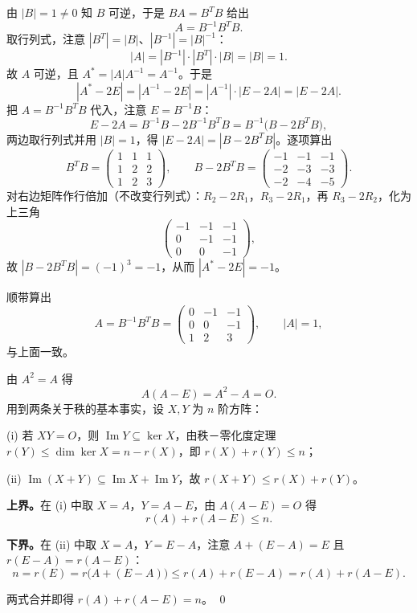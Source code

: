 \begin{solution}
由 $|B|=1\ne0$ 知 $B$ 可逆，于是 $BA=B^{T}B$ 给出
\[
A=B^{-1}B^{T}B .
\]
取行列式，注意 $|B^{T}|=|B|$、$|B^{-1}|=|B|^{-1}$：
\[
|A|=|B^{-1}|\cdot|B^{T}|\cdot|B|=|B|=1 .
\]
故 $A$ 可逆，且 $A^{*}=|A|A^{-1}=A^{-1}$。于是
\[
|A^{*}-2E|=|A^{-1}-2E|=|A^{-1}|\cdot|E-2A|=|E-2A| .
\]
把 $A=B^{-1}B^{T}B$ 代入，注意 $E=B^{-1}B$：
\[
E-2A=B^{-1}B-2B^{-1}B^{T}B=B^{-1}\bigl(B-2B^{T}B\bigr),
\]
两边取行列式并用 $|B|=1$，得 $|E-2A|=|B-2B^{T}B|$。逐项算出
\[
B^{T}B=\begin{pmatrix}1&1&1\\1&2&2\\1&2&3\end{pmatrix},\qquad
B-2B^{T}B=\begin{pmatrix}-1&-1&-1\\-2&-3&-3\\-2&-4&-5\end{pmatrix}.
\]
对右边矩阵作行倍加（不改变行列式）：$R_2-2R_1$，$R_3-2R_1$，再 $R_3-2R_2$，化为上三角
\[
\begin{pmatrix}-1&-1&-1\\0&-1&-1\\0&0&-1\end{pmatrix},
\]
故 $|B-2B^{T}B|=(-1)^{3}=-1$，从而 $|A^{*}-2E|=-1$。

顺带算出
\[
A=B^{-1}B^{T}B=\begin{pmatrix}0&-1&-1\\0&0&-1\\1&2&3\end{pmatrix},\qquad |A|=1,
\]
与上面一致。
\end{solution}

\begin{solution}
由 $A^{2}=A$ 得
\[
A(A-E)=A^{2}-A=O .
\]
用到两条关于秩的基本事实，设 $X,Y$ 为 $n$ 阶方阵：

(i) 若 $XY=O$，则 $\operatorname{Im}Y\subseteq\ker X$，由秩－零化度定理
$r(Y)\le\dim\ker X=n-r(X)$，即 $r(X)+r(Y)\le n$；

(ii) $\operatorname{Im}(X+Y)\subseteq\operatorname{Im}X+\operatorname{Im}Y$，故 $r(X+Y)\le r(X)+r(Y)$。

\textbf{上界。}在 (i) 中取 $X=A$，$Y=A-E$，由 $A(A-E)=O$ 得
\[
r(A)+r(A-E)\le n .
\]

\textbf{下界。}在 (ii) 中取 $X=A$，$Y=E-A$，注意 $A+(E-A)=E$ 且 $r(E-A)=r(A-E)$：
\[
n=r(E)=r\bigl(A+(E-A)\bigr)\le r(A)+r(E-A)=r(A)+r(A-E).
\]

两式合并即得 $r(A)+r(A-E)=n$。
\qed
\end{solution}

